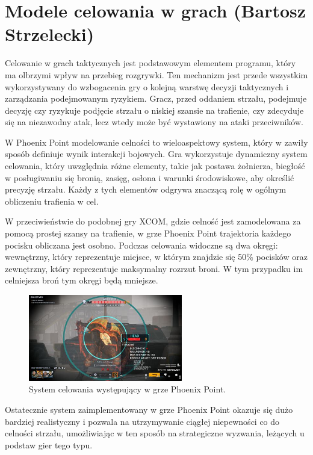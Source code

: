 \section{Modele celowania w grach (Bartosz Strzelecki)}
Celowanie w grach taktycznych jest podstawowym elementem programu, który ma
olbrzymi wpływ na przebieg rozgrywki. Ten mechanizm jest przede wszystkim wykorzystywany
do wzbogacenia gry o kolejną warstwę decyzji taktycznych i zarządzania podejmowanym ryzykiem.
Gracz, przed oddaniem strzału, podejmuje decyzję czy ryzykuje podjęcie strzału o niskiej szansie
na trafienie, czy zdecyduje się na niezawodny atak, lecz wtedy może być wystawiony na ataki przeciwników.

W Phoenix Point modelowanie celności to wieloaspektowy system, który w zawiły sposób definiuje wynik interakcji bojowych. 
Gra wykorzystuje dynamiczny system celowania, który uwzględnia różne elementy, takie jak postawa żołnierza, biegłość w posługiwaniu się bronią, zasięg, 
osłona i warunki środowiskowe, aby określić precyzję strzału. Każdy z tych elementów odgrywa znaczącą rolę w ogólnym obliczeniu trafienia w cel.

W przeciwieństwie do podobnej gry XCOM, gdzie celność jest zamodelowana za pomocą prostej szansy na trafienie, w grze Phoenix Point
trajektoria każdego pocisku obliczana jest osobno. Podczas celowania widoczne są dwa okręgi: wewnętrzny, który reprezentuje miejsce,
w którym znajdzie się 50\% pocisków oraz zewnętrzny, który reprezentuje maksymalny rozrzut broni. W tym przypadku im celniejsza broń tym
okręgi będą mniejsze.

\begin{figure}[h]
\centering
\includegraphics[width=0.6\textwidth]{images/point}
\caption{System celowania występujący w grze Phoenix Point.}
\label{fig:acc}
\end{figure}

Ostatecznie system zaimplementowany w grze Phoenix Point okazuje się dużo bardziej realistyczny i pozwala na utrzymywanie ciągłej niepewności
co do celności strzału, umożliwiając w ten sposób na strategiczne wyzwania, leżących u podstaw gier tego typu. 
